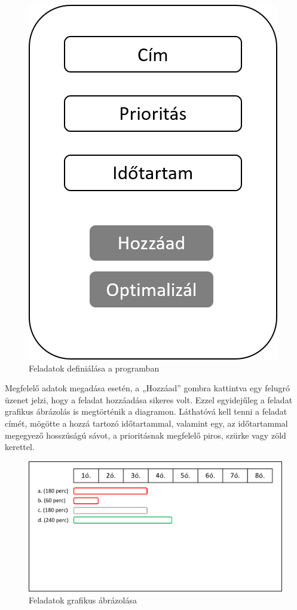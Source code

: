 \begin{figure}[h]
	\centering
	\includegraphics[scale=0.6]{images/addTasks.png}
	\caption{Feladatok definiálása a programban}
\end{figure}

Megfelelő adatok megadása esetén, a „Hozzáad” gombra kattintva egy felugró üzenet jelzi, hogy a feladat hozzáadása sikeres volt. Ezzel egyidejűleg a feladat grafikus ábrázolás is megtörténik a diagramon. Láthatóvá kell tenni a feladat címét, mögötte a hozzá tartozó időtartammal, valamint egy, az időtartammal megegyező hosszúságú sávot, a prioritásnak megfelelő piros, szürke vagy zöld kerettel.


\begin{figure}[h]
	\centering
	\includegraphics[scale=0.8]{images/diagram.png}
	\caption{Feladatok grafikus ábrázolása}
\end{figure}

